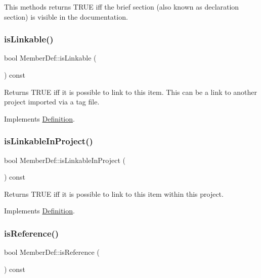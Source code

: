 This methods returns T\+R\+UE iff the brief section (also known as declaration section) is visible in the documentation. \mbox{\label{class_member_def_a2a703ac083e9314dc800df330f3eb683}} 
\subsubsection{\texorpdfstring{isLinkable()}{isLinkable()}}
{\footnotesize\ttfamily bool Member\+Def\+::is\+Linkable (\begin{DoxyParamCaption}{ }\end{DoxyParamCaption}) const\hspace{0.3cm}{\ttfamily [virtual]}}

Returns T\+R\+UE iff it is possible to link to this item. This can be a link to another project imported via a tag file. 

Implements \mbox{\hyperlink{class_definition_a4002fd79c2d4dcf667c37c83d4214deb}{Definition}}.

\mbox{\label{class_member_def_ab53677dd2218300ee758263ec23e8cbd}} 
\subsubsection{\texorpdfstring{isLinkableInProject()}{isLinkableInProject()}}
{\footnotesize\ttfamily bool Member\+Def\+::is\+Linkable\+In\+Project (\begin{DoxyParamCaption}{ }\end{DoxyParamCaption}) const\hspace{0.3cm}{\ttfamily [virtual]}}

Returns T\+R\+UE iff it is possible to link to this item within this project. 

Implements \mbox{\hyperlink{class_definition_a845891c7206d40c3664b562636cdf9fc}{Definition}}.

\mbox{\label{class_member_def_a285b80c1f135ce6ed9fa3a52e1435538}} 
\subsubsection{\texorpdfstring{isReference()}{isReference()}}
{\footnotesize\ttfamily bool Member\+Def\+::is\+Reference (\begin{DoxyParamCaption}{ }\end{DoxyParamCaption}) const\hspace{0.3cm}{\ttfamily [virtual]}}


